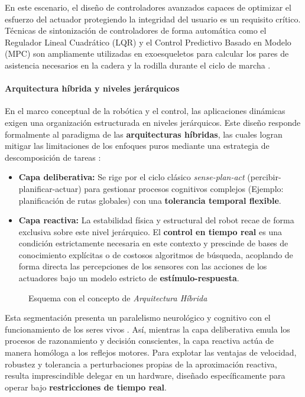 \documentclass[11pt,fleqn]{book} %
\begin{document}
En este escenario, el diseño de controladores avanzados capaces de optimizar el esfuerzo del actuador protegiendo la integridad del usuario es un requisito crítico. Técnicas de sintonización de controladores de forma automática como el Regulador Lineal Cuadrático (LQR) y el Control Predictivo Basado en Modelo (MPC) son ampliamente utilizadas en exoesqueletos para calcular los pares de asistencia necesarios en la cadera y la rodilla durante el ciclo de marcha \cite{mashud2024}. 

\paragraph{Arquitectura híbrida y niveles jerárquicos}
En el marco conceptual de la robótica y el control, las aplicaciones dinámicas exigen una organización estructurada en niveles jerárquicos. Este diseño responde formalmente al paradigma de las \textbf{arquitecturas híbridas}, las cuales logran mitigar las limitaciones de los enfoques puros mediante una estrategia de descomposición de tareas \cite{gavilan_agentes}:
\begin{itemize}[]
	\item \textbf{Capa deliberativa:} Se rige por el ciclo clásico \textit{sense-plan-act} (percibir-planificar-actuar) para gestionar procesos cognitivos complejos (Ejemplo: planificación de rutas globales) con una \textbf{tolerancia temporal flexible}. 
	
	\item \textbf{Capa reactiva:} La estabilidad física y estructural del robot recae de forma exclusiva sobre este nivel jerárquico. El \textbf{control en tiempo real} es una condición estrictamente necesaria en este contexto y prescinde de bases de conocimiento explícitas o de costosos algoritmos de búsqueda, acoplando de forma directa las percepciones de los sensores con las acciones de los actuadores bajo un modelo estricto de \textbf{estímulo-respuesta}. 
\end{itemize}
\begin{figure}[ht]
	\centering
	\resizebox{\textwidth}{!}{%
		
	}
	\caption{Esquema con el concepto de \textit{Arquitectura Híbrida}}
	\label{fig:paradigma_hibrido}
\end{figure}

Esta segmentación presenta un paralelismo neurológico y cognitivo con el funcionamiento de los seres vivos \cite{gavilan_agentes}. Así, mientras la capa deliberativa emula los procesos de razonamiento y decisión conscientes, la capa reactiva actúa de manera homóloga a los reflejos motores. 
Para explotar las ventajas de velocidad, robustez y tolerancia a perturbaciones propias de la aproximación reactiva, resulta imprescindible delegar en un hardware, diseñado específicamente para operar bajo \textbf{restricciones de tiempo real}.
\end{document}

